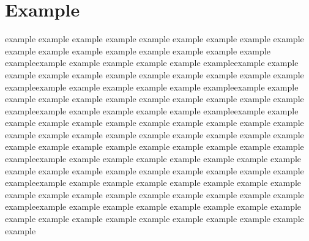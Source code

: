 \section{Example}
example example example example example example example example example\newline
example example example example example example example example example\newline example example example example example exampleexample example example\newline
example example example example example example example example example\newline example example example example example exampleexample example example\newline
example example example example example example example example example\newline example example example example example exampleexample example example\newline
example example example example example example example example example\newline
example example example example example example example example example\newline
example example example example example example example example example\newline example example example example example example example example example\newline
example example example example example example example example example\newline example example example example example example example example example\newline
example example example example example example example example example\newline example example example example example example example example example\newline
example example example example example example example example example\newline
